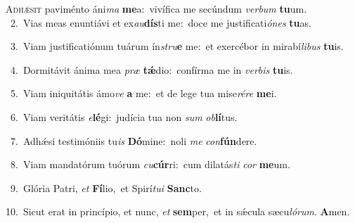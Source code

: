 \lettrine{\initial\textcolor{\initialcolor}{A}}{dhǽsit} paviménto áni\textit{ma} \textbf{me}\-a:~\star vivífica me secúndum \textit{ver}\-\textit{bum} \textbf{tu}\-um.\\
{\numbfont\textcolor{\numbcolor}{~2.}}~Vias meas enuntiávi et ex\-\textit{au}\-\textbf{dís}ti me:~\star doce me justificati\-\textit{ó}\-\textit{nes} \textbf{tu}\-as.\par
{\numbfont\textcolor{\numbcolor}{~3.}}~Viam justificatiónum tuárum ín\-\textit{stru}\-\textbf{e} me:~\star et exercébor in mirabí\-\textit{li}\-\textit{bus} \textbf{tu}\-is.\par
{\numbfont\textcolor{\numbcolor}{~4.}}~Dormitávit ánima mea \textit{præ} \textbf{tǽ}\-dio:~\star confírma me in \textit{ver}\-\textit{bis} \textbf{tu}\-is.\par
{\numbfont\textcolor{\numbcolor}{~5.}}~Viam iniquitátis ámo\textit{ve} \textbf{a} me:~\star et de lege tua mise\-\textit{ré}\-\textit{re} \textbf{me}\-i.\par
{\numbfont\textcolor{\numbcolor}{~6.}}~Viam veritátis \textit{e}\-\textbf{lé}gi:~\star judícia tua non \textit{sum} \textit{ob}\-\textbf{lí}tus.\par
{\numbfont\textcolor{\numbcolor}{~7.}}~Adhǽsi testimóniis tu\textit{is} \textbf{Dó}\-mine:~\star noli \textit{me} \textit{con}\-\textbf{fún}dere.\par
{\numbfont\textcolor{\numbcolor}{~8.}}~Viam mandatórum tuórum \textit{cu}\-\textbf{cúr}ri:~\star cum dilatás\textit{ti} \textit{cor} \textbf{me}\-um.\par
{\numbfont\textcolor{\numbcolor}{~9.}}~Glória Patri, \textit{et} \textbf{Fí}\-lio,~\star et Spirí\-\textit{tu}\-\textit{i} \textbf{Sanc}\-to.\par
{\numbfont\textcolor{\numbcolor}{10.}}~Sicut erat in princípio, et nunc, \textit{et} \textbf{sem}\-per,~\star et in sǽcula sæcu\-\textit{ló}\-\textit{rum}. \textbf{A}\-men.\par
